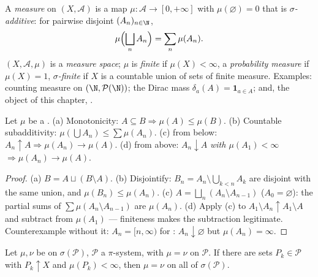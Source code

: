 \begin{definition}\label{def:b3:measure:measure}
A \emph{measure} on $(X, \mathcal A)$ is a map
$\mu \colon \mathcal A \to [0, +\infty]$ with $\mu(\varnothing)
= 0$ that is \emph{$\sigma$-additive}: for pairwise disjoint
$(A_n)_{n\in\N}$,
\[
\mu\Bigl(\bigsqcup_n A_n\Bigr) = \sum_n \mu(A_n).
\]
$(X, \mathcal A, \mu)$ is a \emph{measure space}; $\mu$ is
\emph{finite} if $\mu(X) < \infty$, a \emph{probability
measure} if $\mu(X) = 1$, \emph{$\sigma$-finite} if $X$ is a
countable union of sets of finite measure. Examples: counting
measure on $(\N, \mathcal P(\N))$; the Dirac mass $\delta_a(A)
= \mathbf 1_{a \in A}$; and, the object of this chapter,
.
\end{definition}

\begin{proposition}\label{prop:b3:measure:basics}
Let $\mu$ be a . (a) Monotonicity: $A \subseteq B
\Rightarrow \mu(A) \leq \mu(B)$. (b) Countable subadditivity:
$\mu(\bigcup A_n) \leq \sum\mu(A_n)$. (c)  from
below: $A_n \uparrow A \Rightarrow \mu(A_n) \to \mu(A)$. (d)
 from above: $A_n \downarrow A$ \emph{with
$\mu(A_1) < \infty$} $\Rightarrow \mu(A_n) \to \mu(A)$.
\end{proposition}

\begin{proof}
(a) $B = A \sqcup (B\setminus A)$. (b) Disjointify: $B_n = A_n
\setminus \bigcup_{k<n}A_k$ are disjoint with the same union,
and $\mu(B_n) \leq \mu(A_n)$. (c) $A = \bigsqcup_n (A_n
\setminus A_{n-1})$ ($A_0 = \varnothing$): the partial sums of
$\sum\mu(A_n\setminus A_{n-1})$ are $\mu(A_n)$. (d) Apply (c)
to $A_1 \setminus A_n \uparrow A_1 \setminus A$ and subtract
from $\mu(A_1)$ --- finiteness makes the subtraction
legitimate. Counterexample without it: $A_n = [n, \infty)$ for
: $A_n \downarrow \varnothing$ but $\mu(A_n) =
\infty$.
\end{proof}

\begin{theorem}[Uniqueness]\label{thm:b3:measure:uniqueness}
Let $\mu, \nu$ be  on $\sigma(\mathcal P)$, $\mathcal
P$ a $\pi$-system, with $\mu = \nu$ on $\mathcal P$. If there
are sets $P_k \in \mathcal P$ with $P_k \uparrow X$ and
$\mu(P_k) < \infty$, then $\mu = \nu$ on all of
$\sigma(\mathcal P)$.
\end{theorem}

